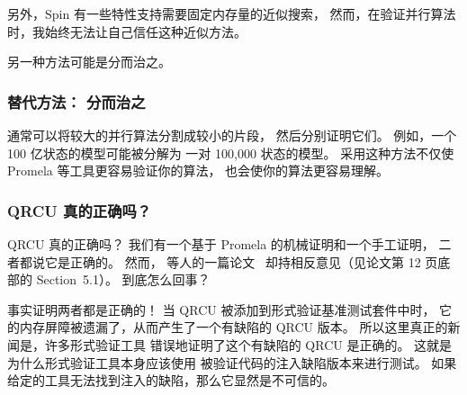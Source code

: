 另外，Spin 有一些特性支持需要固定内存量的近似搜索，
然而，在验证并行算法时，我始终无法让自己信任这种近似方法。

另一种方法可能是分而治之。

\subsubsection{替代方法：
				     分而治之}
\label{sec:formal:Alternative Approach: Divide and Conquer}

通常可以将较大的并行算法分割成较小的片段，
然后分别证明它们。
例如，一个 100 亿状态的模型可能被分解为
一对 100,000 状态的模型。
采用这种方法不仅使 Promela 等工具更容易验证你的算法，
也会使你的算法更容易理解。

\subsubsection{QRCU 真的正确吗？}
\label{sec:formal:Is QRCU Really Correct?}

QRCU 真的正确吗？
我们有一个基于 Promela 的机械证明和一个手工证明，
二者都说它是正确的。
然而， 等人的一篇论文~\cite{JadeAlglave2013-cav}
却持相反意见（见论文第 12 页底部的 Section~5.1）。
到底怎么回事？

事实证明两者都是正确的！
当 QRCU 被添加到形式验证基准测试套件中时，
它的内存屏障被遗漏了，从而产生了一个有缺陷的 QRCU 版本。
所以这里真正的新闻是，许多形式验证工具
错误地证明了这个有缺陷的 QRCU 是正确的。
这就是为什么形式验证工具本身应该使用
被验证代码的注入缺陷版本来进行测试。
如果给定的工具无法找到注入的缺陷，那么它显然是不可信的。

\QuickQuizEnd

